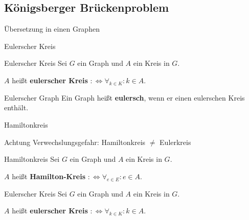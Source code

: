 \subsection{Königsberger Brückenproblem}




\begin{frame}{Übersetzung in einen Graphen}
\begin{center}
\end{center}
\end{frame}

\begin{frame}{Eulerscher Kreis}
\begin{block}{Eulerscher Kreis}
Sei $G$ ein Graph und $A$ ein Kreis in $G$.

$A$ heißt \textbf{eulerscher Kreis} $:\Leftrightarrow \forall_{k \in K}: k \in A$.
\end{block}

\begin{block}{Eulerscher Graph}
Ein Graph heißt \textbf{eulersch}, wenn er einen eulerschen Kreis enthält.
\end{block}
\end{frame}

\begin{frame}{Hamiltonkreis}
\begin{alertblock}{Achtung}
Verwechslungsgefahr: Hamiltonkreis $\neq$ Eulerkreis
\end{alertblock}

\begin{block}{Hamiltonkreis}
Sei $G$ ein Graph und $A$ ein Kreis in $G$.

$A$ heißt \textbf{Hamilton-Kreis} $:\Leftrightarrow \forall_{e \in E}: e \in A$.
\end{block}

\begin{block}{Eulerscher Kreis}
Sei $G$ ein Graph und $A$ ein Kreis in $G$.

$A$ heißt \textbf{eulerscher Kreis} $:\Leftrightarrow \forall_{k \in K}: k \in A$.
\end{block}
\end{frame}

